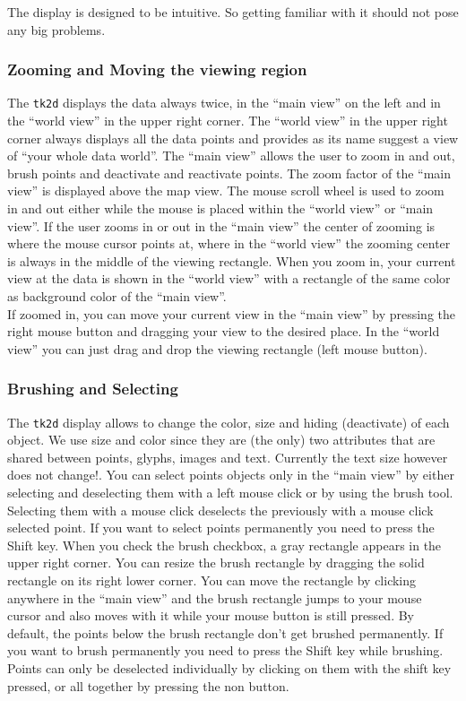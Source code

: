 \documentclass[12pt,oneside,titlepage,letter]{article}
\newcommand{\modify}[1]{{\color{blue}#1}}
\begin{document}
The display is designed to be intuitive. So getting familiar with it should not pose any big problems. 

\subsubsection{Zooming and Moving the viewing region}
The \texttt{tk2d} displays the data always twice, in the ``main view'' on the left and in the ``world view'' in the upper right corner. The ``world view'' in the upper right corner always displays all the data points and provides as its name suggest a view of ``your whole data world''. The ``main view'' allows the user to zoom in and out, brush points and deactivate and reactivate points. The zoom factor of the ``main view'' is displayed above the map view. The mouse scroll wheel is used to zoom in and out either while the mouse is placed within the ``world view'' or ``main view''. If the user zooms in or out in the ``main view'' the center of zooming is where the mouse cursor points at, where in the ``world view'' the zooming center is always in the middle of the viewing rectangle. When you zoom in, your current view at the data is shown in the ``world view'' with a rectangle of the same color as background color of the ``main view''.\\

If zoomed in, you can move your current view in the ``main view'' by pressing the right mouse button and dragging your view to the desired place. In the ``world view'' you can just drag and drop the viewing rectangle (left mouse button).
 
 \subsubsection{Brushing and Selecting}
The \texttt{tk2d} display allows to change the color, size and hiding (deactivate) of each object. We use size and color since they are (the only) two attributes that are shared between points, glyphs, images and text. \modify{Currently the text size however does not change!}. You can select points \modify{objects} only in the ``main view'' by either selecting and deselecting them with a left mouse click or by using the brush tool. Selecting them with a mouse click deselects the previously with a mouse click selected point. If you want to select points permanently you need to press the Shift key. When you check the brush checkbox, a gray rectangle appears in the upper right corner. You can resize the brush rectangle by dragging the solid rectangle on its right lower corner. You can move the rectangle by clicking anywhere in the ``main view'' and the brush rectangle jumps to your mouse cursor and also moves with it while your mouse button is still pressed. By default, the points below the brush rectangle don't get brushed permanently. If you want to brush permanently you need to press the Shift key while brushing. Points can only be deselected individually by clicking on them with the shift key pressed, or all together by pressing the non button.
\end{document}
